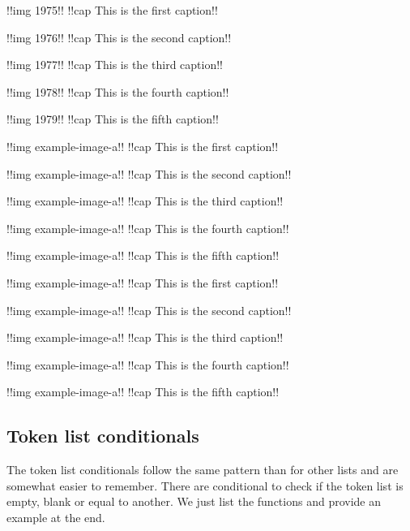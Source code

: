 \begin{multiimages}[last=center, env=figure,pos=ht]
  !!img 1975!! 
  !!cap This is the first caption!!

  !!img 1976!!
  !!cap This is the second caption!!

  !!img 1977!!
  !!cap This is the third caption!!

  !!img 1978!!
  !!cap This is the fourth caption!!

  !!img 1979!!
  !!cap This is the fifth caption!!

\end{multiimages}


\begin{multiimages}[last=center]
  !!img example-image-a!! 
  !!cap This is the first caption!!

  !!img example-image-a!!
  !!cap This is the second caption!!

  !!img example-image-a!!
  !!cap This is the third caption!!

  !!img example-image-a!!
  !!cap This is the fourth caption!!

  !!img example-image-a!!
  !!cap This is the fifth caption!!

\end{multiimages}

\begin{multiimages}[last=center,env=figure,pos=p,inner=3cm,skip=10ex]
  !!img example-image-a!! 
  !!cap This is the first caption!!

  !!img example-image-a!!
  !!cap This is the second caption!!

  !!img example-image-a!!
  !!cap This is the third caption!!

  !!img example-image-a!!
  !!cap This is the fourth caption!!

  !!img example-image-a!!
  !!cap This is the fifth caption!!

\end{multiimages}

\subsection{Token list conditionals}

The token list conditionals follow the same pattern than for other lists and are somewhat easier to remember.
There are conditional to check if the token list is empty, blank or equal to another. We just list the functions and provide an example at the end.

